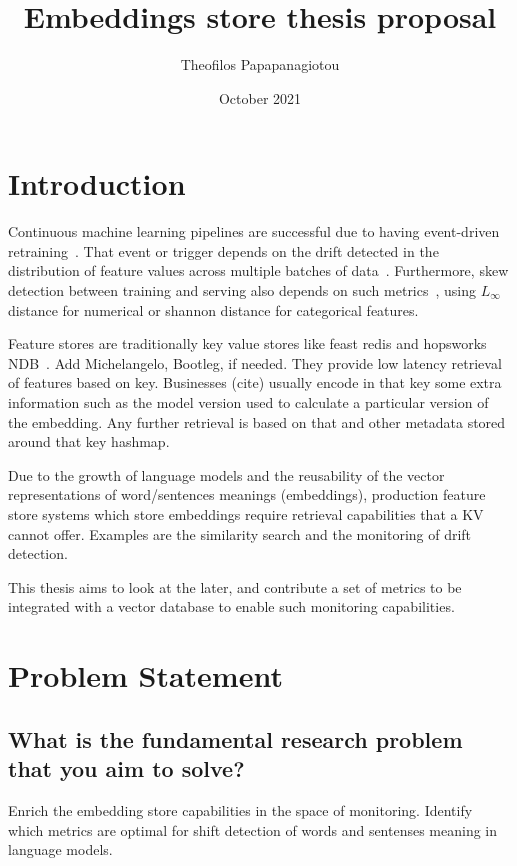 \documentclass{article}
\title{Embeddings store thesis proposal}
\author{Theofilos Papapanagiotou}
\date{October 2021}
\begin{document}
\maketitle
\section{Introduction}
Continuous machine learning pipelines are successful due to having event-driven retraining~\cite{baylorContinuousTrainingProduction2019a}. That event or trigger
depends on the drift detected in the distribution of feature values across multiple batches of data~\cite{breckDataValidationMachine}.
Furthermore, skew detection between training and serving also depends on such metrics~\cite{cavenessTensorFlowDataValidation2020},
using $L_{\infty}$ distance for numerical or shannon distance for categorical features.

Feature stores are traditionally key value stores like feast redis and hopsworks NDB~\cite{ormenisHorizontallyScalableML}.
Add Michelangelo, Bootleg, if needed.
They provide low latency retrieval of features based on key. Businesses (cite) usually encode in that key some extra
information such as the model version used to calculate a particular version of the embedding. Any further retrieval is based on that and other metadata stored around that key hashmap.

Due to the growth of language models and the reusability of the vector representations of word/sentences meanings (embeddings),
production feature store systems which store embeddings require retrieval capabilities that a KV cannot offer.
Examples are the similarity search and the monitoring of drift detection.\cite{orrManagingMLPipelines2021a}

This thesis aims to look at the later, and contribute a set of metrics to be integrated with a vector database to enable such monitoring capabilities.

\section{Problem Statement}
\subsection{What is the fundamental research problem that you aim to solve?}
Enrich the embedding store capabilities in the space of monitoring. Identify which metrics are optimal for
shift detection of words and sentenses meaning in language models.
\end{document}
